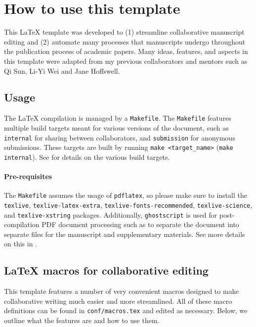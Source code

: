 
\section{How to use this template}

This \LaTeX{} template was developed to (1) streamline collaborative manuscript editing and (2) automate many processes that manu\-scripts undergo throughout the publication process of academic papers.
Many ideas, features, and aspects in this template were adapted from my previous collaborators and mentors such as Qi Sun, Li-Yi Wei and Jane Hoffswell.

\subsection{Usage}

The \LaTeX{} compilation is managed by a \texttt{Makefile}.
The \texttt{Makefile} features multiple build targets meant for various versions of the document, such as \texttt{internal} for sharing between collaborators, and \texttt{submission} for anonymous submissions.
These targets are built by running \texttt{make <target\_name>} (\eg \texttt{make internal}).
See  for details on the various build targets.

\paragraph{Pre-requisites}
The \texttt{Makefile} assumes the usage of \texttt{pdflatex}, so please make sure to install the \texttt{texlive}, \texttt{texlive-latex-extra}, \texttt{texlive-fonts-recommended}, \texttt{texlive-science}, and \texttt{texlive-x\hfill\break string} packages.
Additionally, \texttt{ghostscript} is used for post-com\-pilation PDF document processing such as to separate the document into separate files for the manuscript and supplementary materials.
See more details on this in .

\subsection{\LaTeX{} macros for collaborative editing}
\label{sec:howto:macros}

This template features a number of very convenient macros designed to make collaborative writing much easier and more streamlined.
All of these macro definitions can be found in \texttt{conf/macros.tex} and edited as necessary.
Below, we outline what the features are and how to use them.

